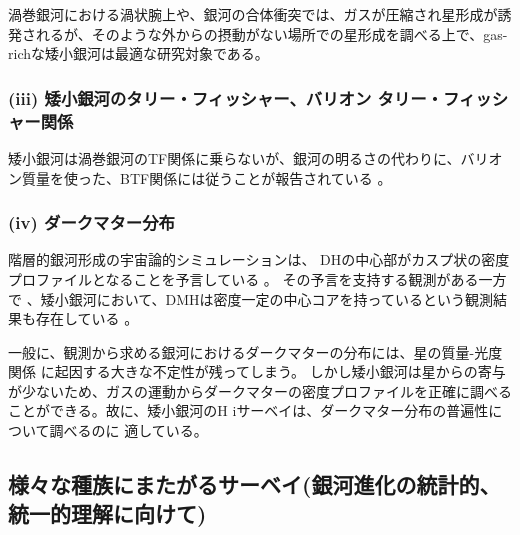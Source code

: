 渦巻銀河における渦状腕上や、銀河の合体衝突では、ガスが圧縮され星形成が誘発されるが、そのような外からの摂動がない場所での星形成を調べる上で、gas-richな矮小銀河は最適な研究対象である。


\subsubsection{(iii) 矮小銀河のタリー・フィッシャー、バリオン タリー・フィッシャー関係}

矮小銀河は渦巻銀河のTF関係に乗らないが、銀河の明るさの代わりに、バリオン質量を使った、BTF関係には従うことが報告されている \citep{2000ApJ...533L..99M,2005ApJ...632..859M}。


\subsubsection{(iv) ダークマター分布}

階層的銀河形成の宇宙論的シミュレーションは、
DHの中心部がカスプ状の密度プロファイルとなることを予言している \citep[e.g.,][]{2004MNRAS.349.1039N}。
その予言を支持する観測がある一方で \citep[e.g.,][]{2001MNRAS.325.1017V,2005ApJ...634..227D}、矮小銀河において、DMHは密度一定の中心コアを持っているという観測結果も存在している \citep[e.g.,][]{2003MNRAS.340..657D,2003MNRAS.340...12W}。

一般に、観測から求める銀河におけるダークマターの分布には、星の質量-光度関係
に起因する大きな不定性が残ってしまう。
しかし矮小銀河は星からの寄与が少ないため、ガスの運動からダークマターの密度プロファイルを正確に調べることができる。故に、矮小銀河のH {\sc i}サーベイは、ダークマター分布の普遍性について調べるのに
適している。


\subsection{様々な種族にまたがるサーベイ(銀河進化の統計的、統一的理解に向けて)}
\label{sec:様々な種族にまたがるサーベイ}

